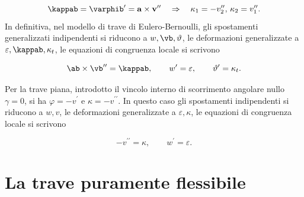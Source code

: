 \begin{equation}\label{Euler_Cin_40}
	\kappab=\varphib'=\mathbf{a}\times\mathbf{v}^{\prime\prime}
	\quad
	\Rightarrow
	\quad
	\kappa_1 =-v_2'',
	\, 
	\kappa_2 =v_1''.
\end{equation}
In definitiva, nel modello di trave di Eulero-Bernoulli, gli spostamenti generalizzati indipendenti si riducono a $w, \vb, \vartheta$, le deformazioni generalizzate a $\varepsilon, \kappab, \kappa_t$, le equazioni di congruenza locale si scrivono
\begin{definition}
	\begin{equation}
	\ab \times \vb^{\prime\prime} = \kappab,
	\qquad
	w^\prime = \varepsilon,
	\qquad
	\vartheta^\prime = \kappa_t.
\end{equation}
\end{definition}





Per la trave piana, introdotto il vincolo interno di scorrimento angolare nullo $\gamma = 0$, si ha $\varphi = - v^\prime$ e $\kappa = - v^{\prime\prime}$. 
In questo caso gli spostamenti  indipendenti si riducono a $w, v$, le deformazioni generalizzate a $\varepsilon, \kappa$, le equazioni di congruenza locale si scrivono
\begin{definition}
	\begin{equation}
	- v^{\prime\prime} = \kappa,
	\qquad
	w^\prime = \varepsilon.
\end{equation}
\end{definition}



\section{La trave puramente flessibile}

